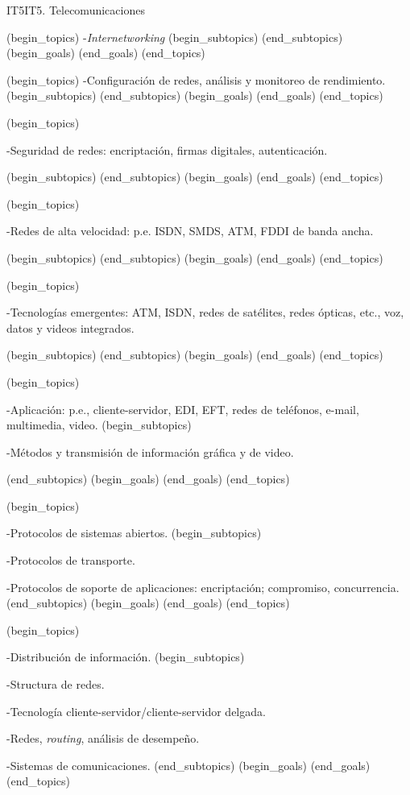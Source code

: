 \begin{BKL2}{IT5}{IT5. Telecomunicaciones}
 

(begin_topics)
-{\it Internetworking}
(begin_subtopics)
(end_subtopics)
(begin_goals)
(end_goals)
(end_topics)

 

(begin_topics)
-Configuración de redes, análisis y monitoreo de rendimiento.
(begin_subtopics)
(end_subtopics)
(begin_goals)
(end_goals)
(end_topics)

 

(begin_topics)

-Seguridad de redes: encriptación, firmas digitales, autenticación.

(begin_subtopics)
(end_subtopics)
(begin_goals)
(end_goals)
(end_topics)

 

(begin_topics)

-Redes de alta velocidad: p.e. ISDN, SMDS, ATM, FDDI de banda ancha.

(begin_subtopics)
(end_subtopics)
(begin_goals)
(end_goals)
(end_topics)

 

(begin_topics)

-Tecnologías emergentes: ATM, ISDN, redes de satélites, redes ópticas, etc., voz, datos y videos integrados.

(begin_subtopics)
(end_subtopics)
(begin_goals)
(end_goals)
(end_topics)

 

(begin_topics)

-Aplicación: p.e., cliente-servidor, EDI, EFT, redes de teléfonos, e-mail, multimedia, video.
(begin_subtopics)

-Métodos y transmisión de información gráfica y de video.

(end_subtopics)
(begin_goals)
(end_goals)
(end_topics)

 

(begin_topics)

-Protocolos de sistemas abiertos.
(begin_subtopics)

-Protocolos de transporte.

-Protocolos de soporte de aplicaciones: encriptación; compromiso, concurrencia.
(end_subtopics)
(begin_goals)
(end_goals)
(end_topics)

 

(begin_topics)

-Distribución de información.
(begin_subtopics)

-Structura de redes.

-Tecnología cliente-servidor/cliente-servidor delgada.

-Redes, {\it routing}, análisis de desempeño.

-Sistemas de comunicaciones.
(end_subtopics)
(begin_goals)
(end_goals)
(end_topics)

\end{BKL2}
 

